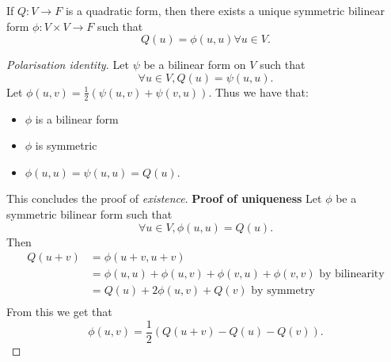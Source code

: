\documentclass[a4paper]{scrartcl}
\begin{document}
\begin{proposition}
     If $Q: V \rightarrow F$ is a quadratic form, then there exists a unique symmetric bilinear form $\phi: V \times V \rightarrow F $ such that 
     \[Q(u)=\phi (u,u) \forall u \in V.\]
\end{proposition}
\begin{proof}[Polarisation identity]
     Let $\psi$ be a bilinear form on $V$ such that 
     \[\forall u \in V, Q(u)=\psi (u,u).\]
     Let $\phi (u,v)=\frac{1}{2} (\psi (u,v)+ \psi (v,u))$. Thus we have that:
     \begin{itemize}
         \item $\phi$ is a bilinear form
         \item $\phi$ is symmetric
         \item $\phi (u,u)=\psi (u,u)=Q (u)$.
     \end{itemize}
     This concludes the proof of \emph{existence}.\newline 
     \textbf{Proof of uniqueness}\newline 
     Let $\phi$ be a symmetric bilinear form such that 
     \[\forall u \in V, \phi (u,u)=Q(u).\]
     Then 
     \begin{equation*}
          \begin{split}
            Q (u+v)&=\phi (u+v,u+v)\\
            &=\phi (u,u)+ \phi (u,v)+\phi (v,u)+ \phi (v,v) \text{ by bilinearity} \\
            &=Q(u)+ 2\phi (u,v)+Q(v) \text{ by symmetry}\\
          \end{split}
     \end{equation*}
     From this we get that 
     \[\phi(u,v)=\frac{1}{2} (Q (u+v)-Q (u)- Q (v)).\]
\end{proof}
\end{document}

